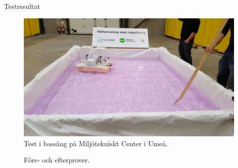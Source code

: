 \documentclass[final]{beamer}
\newlength{\onecolwid}
\begin{document}
\begin{frame}[t]
\begin{columns}[t, totalwidth=\textwidth]
\begin{column}{\onecolwid}
\begin{block}{Testresultat}
        \vskip 2cm
        \begin{figure}[H]
          \centering
          \includegraphics[width=\linewidth]{figures/pool.jpeg}
          \caption{Test i bassäng på Miljötekniskt Center i Umeå.}
        \end{figure}

        \vskip 2cm
        \begin{figure}[H]
          \centering
          \caption{Före- och efterprover.}
        \end{figure}

      \end{block}

    \end{column}

  \end{columns} %

\end{frame} %
\end{document}
